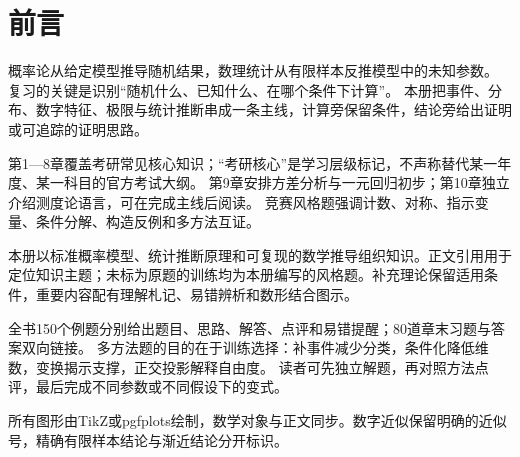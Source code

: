 \chapter{前言}
概率论从给定模型推导随机结果，数理统计从有限样本反推模型中的未知参数。
复习的关键是识别“随机什么、已知什么、在哪个条件下计算”。
本册把事件、分布、数字特征、极限与统计推断串成一条主线，计算旁保留条件，结论旁给出证明或可追踪的证明思路。

第1—8章覆盖考研常见核心知识；“考研核心”是学习层级标记，不声称替代某一年度、某一科目的官方考试大纲。
第9章安排方差分析与一元回归初步；第10章独立介绍测度论语言，可在完成主线后阅读。
竞赛风格题强调计数、对称、指示变量、条件分解、构造反例和多方法互证。

本册以标准概率模型、统计推断原理和可复现的数学推导组织知识。正文引用用于定位知识主题；未标为原题的训练均为本册编写的风格题。补充理论保留适用条件，重要内容配有理解札记、易错辨析和数形结合图示。

全书150个例题分别给出题目、思路、解答、点评和易错提醒；80道章末习题与答案双向链接。
多方法题的目的在于训练选择：补事件减少分类，条件化降低维数，变换揭示支撑，正交投影解释自由度。
读者可先独立解题，再对照方法点评，最后完成不同参数或不同假设下的变式。

所有图形由TikZ或pgfplots绘制，数学对象与正文同步。数字近似保留明确的近似号，精确有限样本结论与渐近结论分开标识。
